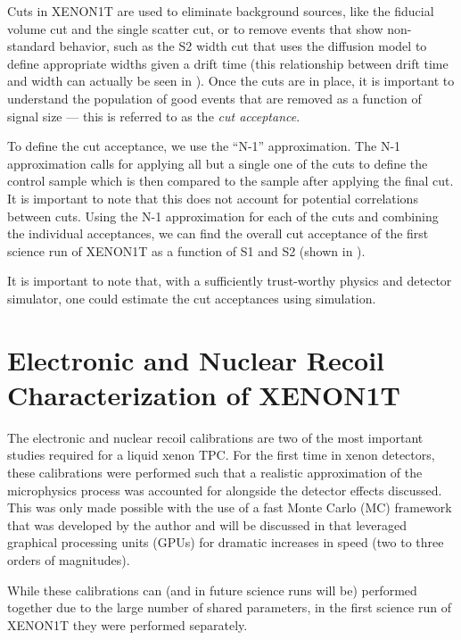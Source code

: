Cuts in XENON1T are used to eliminate background sources, like the fiducial volume cut and the single scatter cut, or to remove events that show non-standard behavior, such as the S2 width cut that uses the diffusion model to define appropriate widths given a drift time (this relationship between drift time and width can actually be seen in ).  Once the cuts are in place, it is important to understand the population of good events that are removed as a function of signal size --- this is referred to as the \textit{cut acceptance}.  

To define the cut acceptance, we use the ``N-1'' approximation.  The N-1 approximation calls for applying all but a single one of the cuts to define the control sample which is then compared to the sample after applying the final cut.  It is important to note that this does not account for potential correlations between cuts.  Using the N-1 approximation for each of the cuts and combining the individual acceptances, we can find the overall cut acceptance of the first science run of XENON1T as a function of S1 and S2 (shown in ).

It is important to note that, with a sufficiently trust-worthy physics and detector simulator, one could estimate the cut acceptances using simulation. 




\section{Electronic and Nuclear Recoil Characterization of XENON1T}
\label{sec:xe1t_er_nr_calibration}

The electronic and nuclear recoil calibrations are two of the most important studies required for a liquid xenon TPC.  For the first time in xenon detectors, these calibrations were performed such that a realistic approximation of the microphysics process was accounted for alongside the detector effects discussed.  This was only made possible with the use of a fast Monte Carlo (MC) framework that was developed by the author and will be discussed in  that leveraged graphical processing units (GPUs) for dramatic increases in speed (two to three orders of magnitudes).

While these calibrations can (and in future science runs will be) performed together due to the large number of shared parameters, in the first science run of XENON1T they were performed separately.  



